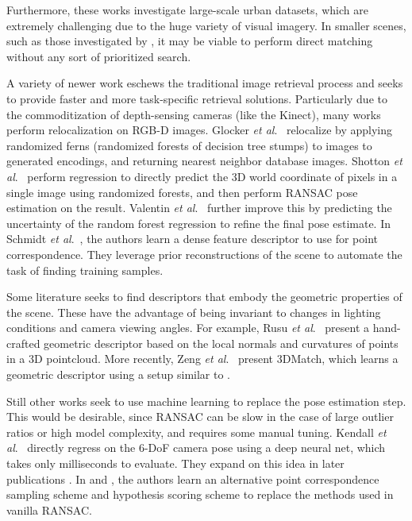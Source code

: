 Furthermore, these works investigate large-scale urban datasets, which are extremely challenging due to the huge variety of visual imagery. In smaller scenes, such as those investigated by \cite{schmidt2017self}, it may be viable to perform direct matching without any sort of prioritized search.

A variety of newer work eschews the traditional image retrieval process and seeks to provide faster and more task-specific retrieval solutions. Particularly due to the commoditization of depth-sensing cameras (like the Kinect), many works perform relocalization on RGB-D images. Glocker \textit{et al}.\ \cite{glocker2013real} \cite{glocker2015real} relocalize by applying randomized ferns (randomized forests of decision tree stumps) to images to generated encodings, and returning nearest neighbor database images. Shotton \textit{et al}.\ \cite{shotton2013scene} perform regression to directly predict the 3D world coordinate of pixels in a single image using randomized forests, and then perform RANSAC pose estimation on the result. Valentin \textit{et al}.\ \cite{valentin2015exploiting} further improve this by predicting the uncertainty of the random forest regression to refine the final pose estimate. In Schmidt \textit{et al}.\ \cite{schmidt2017self}, the authors learn a dense feature descriptor to use for point correspondence. They leverage prior reconstructions of the scene to automate the task of finding training samples.

Some literature seeks to find descriptors that embody the geometric properties of the scene. These have the advantage of being invariant to changes in lighting conditions and camera viewing angles. For example, Rusu \textit{et al}.\ \cite{rusu2009fast} present a hand-crafted geometric descriptor based on the local normals and curvatures of points in a 3D pointcloud. More recently, Zeng \textit{et al}.\ \cite{zeng20163dmatch} present 3DMatch, which learns a geometric descriptor using a setup similar to \cite{schmidt2017self}.

Still other works seek to use machine learning to replace the pose estimation step. This would be desirable, since RANSAC can be slow in the case of large outlier ratios or high model complexity, and requires some manual tuning. Kendall \textit{et al}.\ \cite{kendall2015posenet} directly regress on the 6-DoF camera pose using a deep neural net, which takes only milliseconds to evaluate. They expand on this idea in later publications \cite{kendall2016modelling} \cite{kendall2017geometric}. In \cite{brachmann2014learning} and \cite{brachmann2016dsac}, the authors learn an alternative point correspondence sampling scheme and hypothesis scoring scheme to replace the methods used in vanilla RANSAC.


